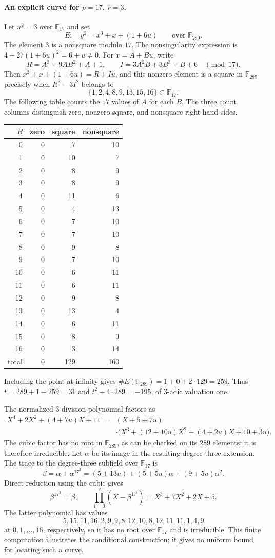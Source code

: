 \documentclass[11pt]{article}
\theoremstyle{definition}
\theoremstyle{remark}
\begin{document}
\paragraph{An explicit curve for $p=17$, $r=3$.}
Let $u^2=3$ over $\mathbb F_{17}$ and set
\[
 E:\quad y^2=x^3+x+(1+6u)
 \qquad\text{over }\mathbb F_{289}.
\]
The element $3$ is a nonsquare modulo $17$.
The nonsingularity expression is
$4+27(1+6u)^2=6+u\ne0$.
For $x=A+Bu$, write
\[
 R=A^3+9AB^2+A+1,\qquad
 I=3A^2B+3B^3+B+6
 \quad\pmod{17}.
\]
Then $x^3+x+(1+6u)=R+Iu$, and this nonzero element is a square
in $\mathbb F_{289}$ precisely when $R^2-3I^2$ belongs to
\[
 \{1,2,4,8,9,13,15,16\}\subset\mathbb F_{17}.
\]
The following table counts the $17$ values of $A$ for each $B$.
The three count columns distinguish zero, nonzero square, and
nonsquare right-hand sides.
\begin{center}
\begin{tabular}{r|rrr}
$B$ & zero & square & nonsquare\\\hline
0&0&7&10\\
1&0&10&7\\
2&0&8&9\\
3&0&8&9\\
4&0&11&6\\
5&0&4&13\\
6&0&7&10\\
7&0&7&10\\
8&0&9&8\\
9&0&7&10\\
10&0&6&11\\
11&0&6&11\\
12&0&9&8\\
13&0&13&4\\
14&0&6&11\\
15&0&8&9\\
16&0&3&14\\\hline
total&0&129&160
\end{tabular}
\end{center}
Including the point at infinity gives
$\#E(\mathbb F_{289})=1+0+2\cdot129=259$.
Thus $t=289+1-259=31$ and $t^2-4\cdot289=-195$, of
$3$-adic valuation one.

The normalized $3$-division polynomial factors as
\begin{align*}
 X^4+2X^2+(4+7u)X+11
  ={}&(X+5+7u)\\[-2pt]
 &\cdot\bigl(X^3+(12+10u)X^2
             +(4+2u)X+10+3u\bigr).
\end{align*}
The cubic factor has no root in $\mathbb F_{289}$, as can be
checked on its $289$ elements; it is therefore irreducible.
Let $\alpha$ be its image in the resulting degree-three extension.
The trace to the degree-three subfield over $\mathbb F_{17}$ is
\[
 \beta=\alpha+\alpha^{17^3}
       =(5+13u)+(5+5u)\alpha+(9+5u)\alpha^2.
\]
Direct reduction using the cubic gives
\[
 \beta^{17^3}=\beta,\qquad
 \prod_{i=0}^2(X-\beta^{17^i})=X^3+7X^2+2X+5.
\]
The latter polynomial has values
\[
 5,15,11,16,2,9,9,8,12,10,8,12,11,11,1,4,9
\]
at $0,1,\ldots,16$, respectively, so it has no root over
$\mathbb F_{17}$ and is irreducible.
This finite computation illustrates the conditional construction;
it gives no uniform bound for locating such a curve.
\end{document}
